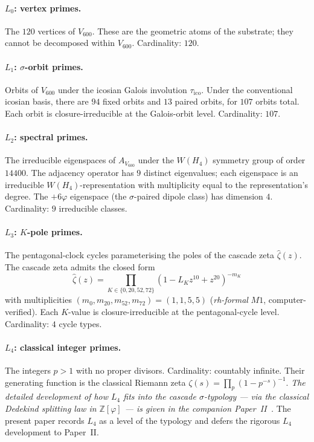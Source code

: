 \documentclass[11pt,a4paper]{article}
\theoremstyle{definition}
\theoremstyle{remark}
\begin{document}
\paragraph{$L_0$: vertex primes.}
The $120$ vertices of $V_{600}$. These are the geometric atoms of the
substrate; they cannot be decomposed within $V_{600}$. Cardinality: $120$.

\paragraph{$L_1$: $\sigma$-orbit primes.}
Orbits of $V_{600}$ under the icosian Galois involution
$\tau_{\mathrm{ico}}$. Under the conventional icosian basis, there are
$94$ fixed orbits and $13$ paired orbits, for $107$ orbits total. Each
orbit is closure-irreducible at the Galois-orbit level. Cardinality: $107$.

\paragraph{$L_2$: spectral primes.}
The irreducible eigenspaces of $A_{V_{600}}$ under the $W(H_4)$ symmetry
group of order $14400$. The adjacency operator has $9$ distinct
eigenvalues; each eigenspace is an irreducible $W(H_4)$-representation
with multiplicity equal to the representation's degree. The $+6\varphi$
eigenspace (the $\sigma$-paired dipole class) has dimension $4$.
Cardinality: $9$ irreducible classes.

\paragraph{$L_3$: $K$-pole primes.}
The pentagonal-clock cycles parameterising the poles of the cascade zeta
$\hat{\zeta}(z)$. The cascade zeta admits the closed form
\[
\hat{\zeta}(z) = \prod_{K \in \{0, 20, 52, 72\}} \left( 1 - L_K z^{10} + z^{20} \right)^{-m_K}
\]
with multiplicities $(m_0, m_{20}, m_{52}, m_{72}) = (1, 1, 5, 5)$ (\emph{rh-formal}
$M1$, computer-verified). Each $K$-value is closure-irreducible at the
pentagonal-cycle level. Cardinality: $4$ cycle types.

\paragraph{$L_4$: classical integer primes.}
The integers $p > 1$ with no proper divisors. Cardinality: countably
infinite. Their generating function is the classical Riemann zeta
$\zeta(s) = \prod_p (1 - p^{-s})^{-1}$. \emph{The detailed development
of how $L_4$ fits into the cascade $\sigma$-typology --- via the
classical Dedekind splitting law in $\mathbb{Z}[\varphi]$ ---
is given in the companion Paper~II~\cite{ClosurePrimesPaperII}.}
The present paper records $L_4$ as a level of the typology and
defers the rigorous $L_4$ development to Paper~II.
\end{document}
